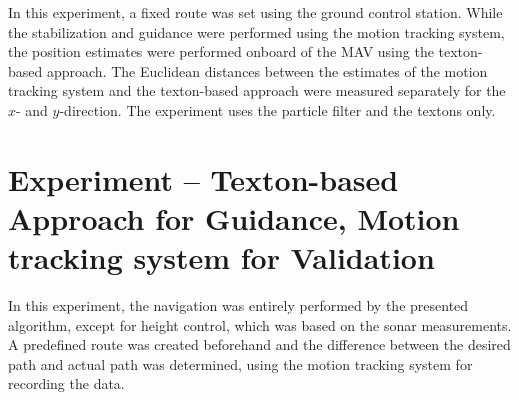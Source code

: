 In this experiment, a fixed route was set using the ground control
station. While the stabilization and guidance were performed using
the motion tracking system, the position estimates were performed onboard
of the MAV using the texton-based approach. The Euclidean distances between the estimates of the motion tracking system and the texton-based approach
were measured separately for the $x$- and $y$-direction. The experiment uses the
particle filter and the textons only.

\section{Experiment -- Texton-based Approach for Guidance, Motion tracking system for Validation}
\label{sec:experiment-6}

In this experiment, the navigation was entirely performed by
the presented algorithm, except for height control, which was based on
the sonar measurements. A predefined route was created beforehand and
the difference between the desired path and actual path was
determined, using the motion tracking system for recording the data.

